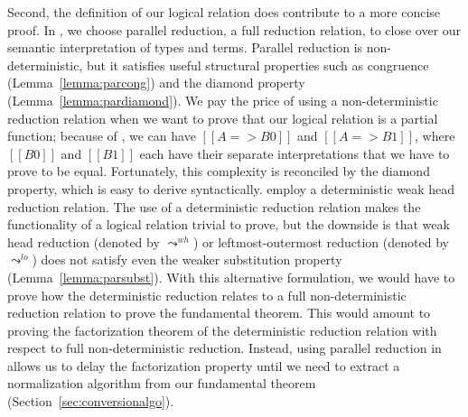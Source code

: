 \documentclass[acmsmall,screen=true,
\ifpublic review=false\else,review=true\fi
  ,anonymous=\ifanonymous true\else false\fi]{acmart}
\begin{document}
Second, the definition of our logical relation does
contribute to a more concise proof.
In , we choose parallel reduction, a full
reduction relation, to close over our semantic interpretation of types
and terms. Parallel reduction is non-deterministic, but it satisfies
useful structural properties such as congruence
(Lemma~\ref{lemma:parcong}) and the diamond property
(Lemma~\ref{lemma:pardiamond}). We pay the price of using a
non-deterministic reduction relation when we want to prove that our
logical relation is a partial function; because of , we
can have $[[A => B0]]$ and $[[A => B1]]$, where $[[B0]]$ and $[[B1]]$
each have their separate interpretations that we have to prove to be
equal. Fortunately, this complexity is reconciled by the
diamond property, which is easy to derive syntactically.
\citet{decagda,nbeincoq} employ a deterministic weak
head reduction relation. The use of a deterministic reduction relation
makes the functionality of a logical relation trivial to prove, but
the downside is that weak head reduction (denoted by $\leadsto^{wh}$)
or leftmost-outermost reduction (denoted by $\leadsto^{lo}$) does
not satisfy even the weaker substitution property
(Lemma~\ref{lemma:parsubst}).
With this alternative formulation, we would have to prove how the
deterministic reduction relates to a full non-deterministic reduction
relation to prove the fundamental theorem. This would amount
to proving the factorization theorem of the deterministic reduction
relation with respect to full non-deterministic reduction. Instead,
using parallel reduction in  allows us to delay the
factorization property until we need to extract a normalization
algorithm from our fundamental theorem (Section~\ref{sec:conversionalgo}).




\end{document}
